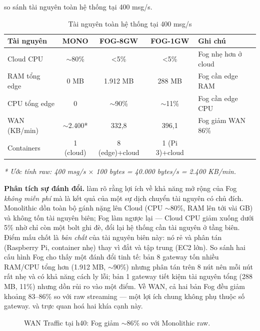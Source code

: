\documentclass[13pt,a4paper]{report}
\begin{document}
 so sánh tài nguyên toàn hệ thống tại 400 msg/s.

\begin{table}[H]
\centering
\caption{Tài nguyên toàn hệ thống tại 400 msg/s}
\label{tab:res-h40}
\small
\begin{tabular}{p{} c c c p{}}
\toprule
\textbf{Tài nguyên} & \textbf{MONO} & \textbf{FOG-8GW} & \textbf{FOG-1GW} & \textbf{Ghi chú} \\
\midrule
Cloud CPU       & $\sim$80\% & \textless 5\% & \textless 5\% & Fog nhẹ hơn ở cloud \\
RAM tổng edge   & 0 MB       & 1.912 MB & 288 MB & Fog cần edge RAM \\
CPU tổng edge   & 0          & $\sim$90\% & $\sim$11\% & Fog cần edge CPU \\
WAN (KB/min)    & $\sim$2.400* & 332,8 & 396,1 & Fog giảm WAN 86\% \\
Containers      & 1 (cloud)  & 8 (edge)+cloud & 1 (Pi 3)+cloud & \\
\bottomrule
\end{tabular}
\end{table}

\noindent\textit{* Ước tính raw: 400 msg/s $\times$ 100 bytes = 40.000 bytes/s = 2.400 KB/min.}

\textbf{Phân tích sự đánh đổi.}  làm rõ rằng lợi ích về khả năng
mở rộng của Fog \textit{không miễn phí} mà là kết quả của một sự dịch chuyển tài
nguyên có chủ đích. Monolithic dồn toàn bộ gánh nặng lên Cloud (CPU $\sim$80\%,
RAM lên tới vài GB) và không tốn tài nguyên biên; Fog làm ngược lại --- Cloud CPU
giảm xuống dưới 5\% nhờ chỉ còn một bolt ghi đè, đổi lại hệ thống cần tài nguyên ở
tầng biên. Điểm mấu chốt là \textit{bản chất} của tài nguyên biên này: nó rẻ và
phân tán (Raspberry Pi, container nhẹ) thay vì đắt và tập trung (EC2 lớn). So sánh
hai cấu hình Fog cho thấy một đánh đổi tinh tế: bản 8 gateway tốn nhiều RAM/CPU
tổng hơn (1.912 MB, $\sim$90\%) nhưng phân tán trên 8 nút nên mỗi nút rất nhẹ và
có khả năng cách ly lỗi; bản 1 gateway tiết kiệm tài nguyên tổng (288 MB, 11\%)
nhưng dồn rủi ro vào một điểm. Về WAN, cả hai bản Fog đều giảm khoảng 83--86\% so
với raw streaming --- một lợi ích chung không phụ thuộc số gateway. 
và  trực quan hoá hai khía cạnh này.

\begin{figure}[H]
\centering
{}
\caption{WAN Traffic tại h40: Fog giảm $\sim$86\% so với Monolithic raw.}
\label{fig:wan-compare}
\end{figure}
\end{document}
